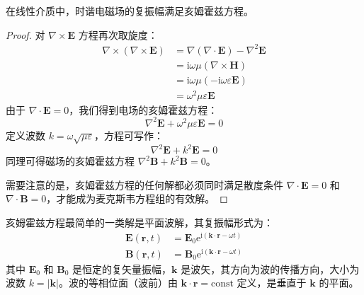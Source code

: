 \documentclass[fontset=none]{ctexart}
\begin{document}
\begin{theorem}[亥姆霍兹方程]
在线性介质中，时谐电磁场的复振幅满足亥姆霍兹方程。
\end{theorem}
\begin{proof}
对 $\nabla \times \bm{E}$ 方程再次取旋度：
\begin{equation}
\begin{aligned}
\nabla \times (\nabla \times \bm{E}) &= \nabla(\nabla \cdot \bm{E}) - \nabla^2 \bm{E} \\
&= \mathrm{i}\omega\mu (\nabla \times \bm{H}) \\
&= \mathrm{i}\omega\mu (-\mathrm{i}\omega\varepsilon\bm{E}) \\
&= \omega^2\mu\varepsilon\bm{E}
\end{aligned}
\end{equation}
由于 $\nabla \cdot \bm{E} = 0$，我们得到电场的亥姆霍兹方程：
\begin{equation}
\nabla^2 \bm{E} + \omega^2\mu\varepsilon \bm{E} = 0
\end{equation}
定义波数 $k = \omega\sqrt{\mu\varepsilon}$，方程可写作：
\begin{equation}
\nabla^2 \bm{E} + k^2 \bm{E} = 0
\end{equation}
同理可得磁场的亥姆霍兹方程 $\nabla^2 \bm{B} + k^2 \bm{B} = 0$。

需要注意的是，亥姆霍兹方程的任何解都必须同时满足散度条件 $\nabla \cdot \bm{E} = 0$ 和 $\nabla \cdot \bm{B} = 0$，才能成为麦克斯韦方程组的有效解。
\end{proof}

\begin{definition}[平面电磁波]
亥姆霍兹方程最简单的一类解是平面波解，其复振幅形式为：
\begin{equation}
\begin{aligned}
\bm{E}(\bm{r}, t) &= \bm{E}_0 \mathrm{e}^{\mathrm{i}(\bm{k} \cdot \bm{r} - \omega t)} \\
\bm{B}(\bm{r}, t) &= \bm{B}_0 \mathrm{e}^{\mathrm{i}(\bm{k} \cdot \bm{r} - \omega t)}
\end{aligned}
\end{equation}
其中 $\bm{E}_0$ 和 $\bm{B}_0$ 是恒定的复矢量振幅，$\bm{k}$ 是波矢，其方向为波的传播方向，大小为波数 $k=|\bm{k}|$。波的等相位面（波前）由 $\bm{k} \cdot \bm{r} = \text{const}$ 定义，是垂直于 $\bm{k}$ 的平面。
\end{definition}
\end{document}
